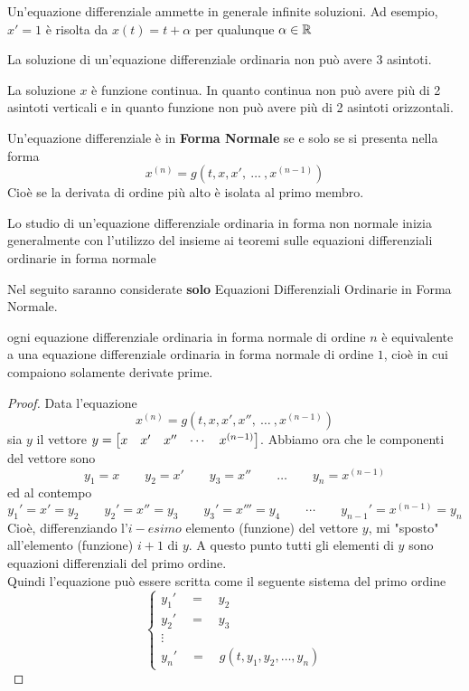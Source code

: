 \begin{example}
	\label{ex:eq_diff_inf_sol}
	Un'equazione differenziale ammette in generale infinite soluzioni. Ad esempio, $x' = 1$ è risolta da $x(t) = t + \alpha$ per qualunque $\alpha \in \mathbb{R}$
\end{example}
\begin{exercise}
	La soluzione di un'equazione differenziale ordinaria non può avere 3 asintoti.
	\begin{solution}
		La soluzione $x$ è funzione continua. In quanto continua non può avere più di 2 asintoti verticali e in quanto funzione non può avere più di 2 asintoti orizzontali.
	\end{solution}
\end{exercise}
\begin{definition}
	Un'equazione differenziale è in \textbf{Forma Normale} se e solo se si presenta nella forma 
	$$x^{(n)} = g(t,x, x',\:\dotsc\:,x^{(n-1)})$$
	Cioè se la derivata di ordine più alto è isolata al primo membro.
\end{definition}
\begin{observation}
	Lo studio di un'equazione differenziale ordinaria in forma non normale inizia generalmente con l'utilizzo del  insieme ai teoremi sulle equazioni differenziali ordinarie in forma normale
\end{observation}
\begin{note}
	Nel seguito saranno considerate \textbf{solo} Equazioni Differenziali Ordinarie in Forma Normale.
\end{note}
\begin{proposition}
	\label{prop:equaz_n_equival_1}
	ogni equazione differenziale ordinaria in forma normale di ordine $n$ è equivalente a una equazione differenziale ordinaria in forma normale di ordine $1$, cioè in cui compaiono solamente derivate prime.
	\begin{proof}
		Data l'equazione
		$$x^{(n)} = g(t,x, x', x'',\:\dotsc\:,x^{(n-1)})$$
		sia $y$ il vettore $y = \begin{bmatrix} x &  x' &  x'' & \cdots & x^{(n-1)} \end{bmatrix}$. Abbiamo ora che le componenti del vettore sono
		$$y_1=x\qquad y_2= x'\qquad y_3= x''\qquad \dots\qquad y_n=x^{(n-1)}$$
		ed al contempo
		$$y_1'= x'=y_2\qquad y_2'= x''=y_3\qquad y_3'= x'''=y_4\qquad\cdots\qquad y_{n-1}'=x^{(n-1)}=y_n$$
		Cioè, differenziando l'$i-esimo$ elemento (funzione) del vettore $y$, mi "sposto" all'elemento (funzione) $i+1$ di $y$. A questo punto tutti gli elementi di $y$ sono equazioni differenziali del primo ordine.\\
		Quindi l'equazione può essere scritta come il seguente sistema del primo ordine
		$$\begin{cases}
			y_1'\quad=\quad y_2\\
			y_2'\quad=\quad y_3\\
			\vdots\\
			y_n' \quad = \quad g(t, y_1, y_2,\dots,y_n)
		\end{cases}$$
	\end{proof}
\end{proposition}
